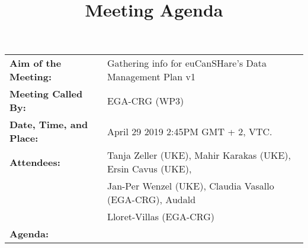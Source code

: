 \documentclass{article}
\begin{document}




\title{Meeting Agenda}
\date{}

%
%


\begin{table}[h]
  \begin{tabular}{ll}
\textbf{Aim of the Meeting:} & Gathering info for euCanSHare's Data Management Plan v1 \\  [5pt]  
\textbf{Meeting Called By:}  &EGA-CRG (WP3)\\[ 5pt]
  \textbf{Date, Time, and Place:}  & April  29 2019 2:45PM GMT + 2, VTC. \\ [5pt]
  \textbf{Attendees:}  & Tanja Zeller (UKE), Mahir Karakas (UKE), Ersin Cavus (UKE), \\ 
 & Jan-Per Wenzel (UKE), Claudia Vasallo (EGA-CRG), Audald \\
 &  Lloret-Villas (EGA-CRG) \\ [50pt]    
\textbf{Agenda:}  &   \\ 
\end{tabular}
\end{table}
%
%

%
%
 
\end{document}

